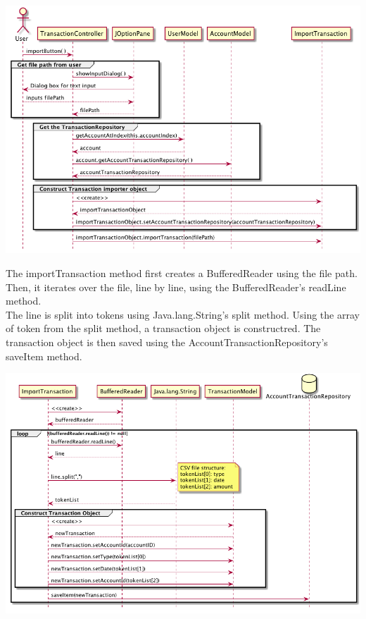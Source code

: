 \documentclass[12pt]{article}
\begin{document}
\includegraphics[width=\textwidth,height=\textheight,keepaspectratio]{diagrams/sequence/importTransaction.png}

The importTransaction method first creates a BufferedReader using the file path. Then, it iterates over the file, line by line, using the BufferedReader's readLine method. \\

The line is split into tokens using Java.lang.String's split method. Using the array of token from the split method, a transaction object is constructred. The transaction object is then saved using the AccountTransactionRepository's saveItem method.

\includegraphics[width=\textwidth,height=\textheight,keepaspectratio]{diagrams/sequence/importTransaction2.png}
\end{document}
